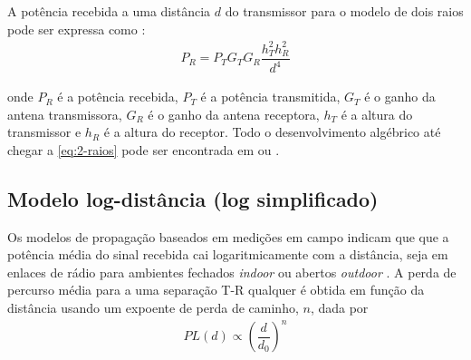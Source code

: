 \begin{figure}[H]
	\centering
\end{figure}

A potência recebida a uma distância $d$ do transmissor para o modelo de dois raios pode ser expressa como \cite{rappaport2009}:
\begin{equation}
	\begin{aligned}
	\label{eq:2-raios}
		P_R = P_TG_TG_R\dfrac{h^2_Th^2_R}{d^4}
	\end{aligned}
\end{equation}

\noindent onde $P_R$ é a potência recebida, $P_T$ é a potência transmitida, $G_T$ é o ganho da antena transmissora, $G_R$ é o ganho da antena receptora, $h_T$ é a altura do transmissor e $h_R$ é a altura do receptor. Todo o desenvolvimento algébrico até chegar a \autoref{eq:2-raios} pode ser encontrada em  ou .

\subsection{Modelo log-distância (log simplificado)}
\label{sub:log-distancia}

Os modelos de propagação baseados em medições em campo indicam que que a potência média do sinal recebida cai logaritmicamente com a distância, seja em enlaces de rádio para ambientes fechados \textit{indoor} ou abertos \textit{outdoor} \cite{rappaport2009}. A perda de percurso média para a uma separação T-R qualquer é obtida em função da distância usando um expoente de perda de caminho, $n$, dada por
\begin{equation}
	\begin{aligned}
	\label{eq:log-distancia}
		PL(d) \propto \left(\dfrac{d}{d_0}\right)^n
	\end{aligned}
\end{equation}

